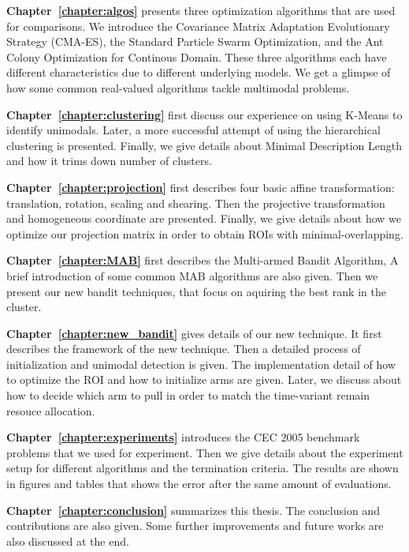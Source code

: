 \textbf{Chapter~\ref{chapter:algos}} presents three optimization algorithms that are used for comparisons.
We introduce 
the Covariance Matrix Adaptation Evolutionary Strategy (CMA-ES),
the Standard Particle Swarm Optimization, and
the Ant Colony Optimization for Continous Domain.
These three algorithms each have different characteristics due to different underlying models.
We get a glimpse of how some common real-valued algorithms tackle multimodal problems. 


\textbf{Chapter~\ref{chapter:clustering}} first discuss our experience on using K-Means to identify unimodals.
Later, a more successful attempt of using the hierarchical clustering is presented.
Finally, we give details about Minimal Description Length and how it trims down number of clusters.

\textbf{Chapter~\ref{chapter:projection}} first describes four basic affine transformation: translation, rotation, scaling and shearing.
Then the projective transformation and homogeneous coordinate are presented.
Finally, we give details about how we optimize our projection matrix in order to obtain ROIs with minimal-overlapping.


\textbf{Chapter~\ref{chapter:MAB}} first describes the Multi-armed Bandit Algorithm, 
A brief introduction of some common MAB algorithms are also given.
Then we present our new bandit techniques, that focus on aquiring the best rank in the cluster.


\textbf{Chapter~\ref{chapter:new_bandit}} gives details of our new technique.
It first describes the framework of the new technique.
Then a detailed process of initialization and unimodal detection is given.
The implementation detail of how to optimize the ROI and how to initialize arms are given.
Later, we discuss about how to decide which arm to pull in order to match the time-variant remain resouce allocation.

\textbf{Chapter~\ref{chapter:experiments}} introduces the CEC 2005 benchmark problems that we used for experiment.
Then we give details about the experiment setup for different algorithms and the termination criteria.
The results are shown in figures and tables that shows the error after the same amount of evaluations.

\textbf{Chapter~\ref{chapter:conclusion}} summarizes this thesis. 
The conclusion and contributions are also given.
Some further improvements and future works are also discussed at the end.


